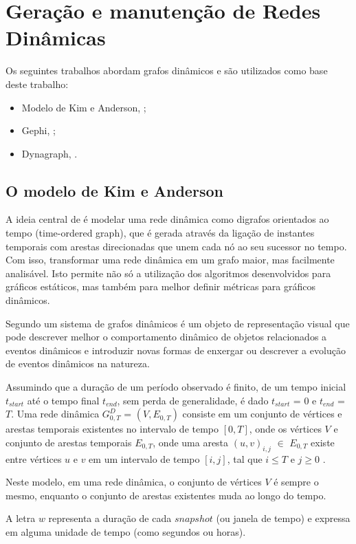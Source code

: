 \FloatBarrier

\section{Geração e manutenção de Redes Dinâmicas}
Os seguintes trabalhos abordam grafos dinâmicos e são utilizados como base deste trabalho:
\begin{itemize}
\item Modelo de Kim e Anderson, \cite{kim};
\item Gephi, \cite{gephi};
\item Dynagraph, \cite{dynagraph}.
\end{itemize}


\subsection{O modelo de Kim e Anderson}
A ideia central de \cite{kim} é modelar uma rede dinâmica como digrafos orientados
ao tempo (time-ordered graph), que é gerada através da ligação de instantes temporais com arestas
direcionadas que unem cada nó ao seu sucessor no tempo. Com isso, transformar uma rede dinâmica
em um grafo maior, mas facilmente analisável. Isto permite não só a utilização dos algoritmos
desenvolvidos para gráficos estáticos, mas também para melhor definir métricas para
gráficos dinâmicos.

Segundo \cite{kim} um sistema de grafos dinâmicos é um objeto de representação visual que pode descrever
melhor o comportamento dinâmico de objetos relacionados a eventos dinâmicos e introduzir
novas formas de enxergar ou descrever a evolução de eventos dinâmicos na natureza.

Assumindo que a duração de um período observado é finito, de um tempo inicial $t_{start}$ até o tempo final $t_{end}$, sem perda de
generalidade, é dado $t_{start}$ = $0$ e $t_{end}$ = $T$. Uma rede dinâmica $G^D_{0,T}$ = $(V, E_{0,T})$ consiste
em um conjunto de vértices e arestas temporais existentes no intervalo de tempo $[0,T]$, onde
os vértices $V$ e conjunto de arestas temporais $E_{0,T}$, onde uma aresta $(u,v)_{i,j}$ $\in$ $E_{0,T}$
existe entre vértices $u$ e $v$ em um intervalo de tempo $[i,j]$, tal que $i \leqslant T$ e $j \geqslant 0$ \cite{kim}.

Neste modelo, em uma rede dinâmica, o conjunto de vértices $V$ é sempre o mesmo, enquanto o conjunto de arestas existentes
muda ao longo do tempo.

A letra $w$ representa a duração de cada $snapshot$ (ou janela de tempo) e expressa em alguma unidade de tempo (como segundos ou horas).

